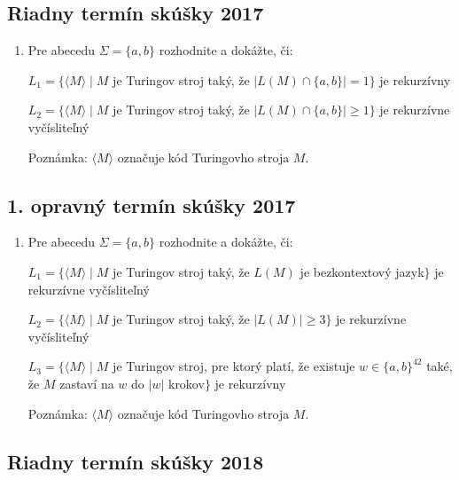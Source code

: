 \documentclass[11pt,a4paper]{article}
\begin{document}
		\subsection{Riadny termín skúšky 2017}

		\begin{enumerate}
			\item Pre abecedu $\Sigma = \{a, b\}$ rozhodnite a dokážte, či:

			$L_1 = \{\langle M \rangle \mid M$ je Turingov stroj taký, že $\vert L(M) \cap \{a,b\} \vert = 1\}$ je rekurzívny
	
			$L_2 = \{\langle M \rangle \mid M$ je Turingov stroj taký, že $\vert L(M) \cap \{a,b\} \vert \geq 1\}$ je rekurzívne vyčísliteľný
	
			Poznámka: $\langle M \rangle$ označuje kód Turingovho stroja $M$.
		\end{enumerate}	

		\subsection{1. opravný termín skúšky 2017}
		
		\begin{enumerate}
			\item Pre abecedu $\Sigma = \{a, b\}$ rozhodnite a dokážte, či:

			$L_1 = \{\langle M \rangle \mid M$ je Turingov stroj taký, že $L(M)$ je bezkontextový jazyk$\}$ je rekurzívne vyčísliteľný
	
			$L_2 = \{\langle M \rangle \mid M$ je Turingov stroj taký, že $\vert L(M) \vert \geq 3\}$ je rekurzívne vyčísliteľný
			
			$L_3 = \{\langle M \rangle \mid M$ je Turingov stroj, pre ktorý platí, že existuje $w \in \{a,b\}^{42}$ také, že $M$ zastaví na $w$ do $\vert w \vert$ krokov$\}$ je rekurzívny
	
			Poznámka: $\langle M \rangle$ označuje kód Turingovho stroja $M$.
		\end{enumerate}	

		\subsection{Riadny termín skúšky 2018}
\end{document}
